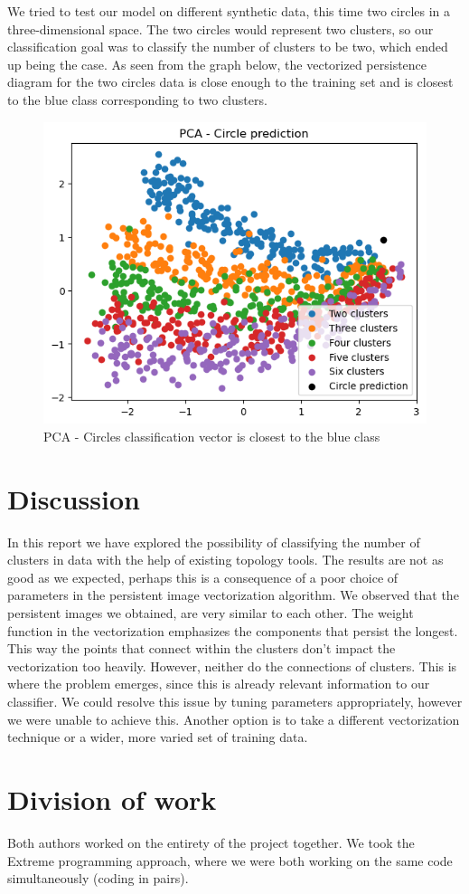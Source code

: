 \documentclass{article}
\begin{document}
We tried to test our model on different synthetic data, this time two circles in a three-dimensional space. The two circles would represent two clusters, so our classification goal was to classify the number of clusters to be two, which ended up being the case. As seen from the graph below, the vectorized persistence diagram for the two circles data is close enough to the training set and is closest to the blue class corresponding to two clusters.

\begin{figure}[H]
    \centering
    \includegraphics[width=0.5\linewidth]{PCACircles.png}
    \caption{PCA - Circles classification vector is closest to the blue class}
\end{figure}

\section{Discussion}
In this report we have explored the possibility of classifying the number of clusters in data with the help of existing topology tools. The results are not as good as we expected, perhaps this is a consequence of a poor choice of parameters in the persistent image vectorization algorithm. We observed that the persistent images we obtained, are very similar to each other. The weight function in the vectorization emphasizes the components that persist the longest. This way the points that connect within the clusters don't impact the vectorization too heavily. However, neither do the connections of clusters. This is where the problem emerges, since this is already relevant information to our classifier. We could resolve this issue by tuning parameters appropriately, however we were unable to achieve this. Another option is to take a different vectorization technique or a wider, more varied set of training data.

\section{Division of work}
Both authors worked on the entirety of the project together. We took the Extreme programming approach, where we were both working on the same code simultaneously (coding in pairs).




\end{document}
